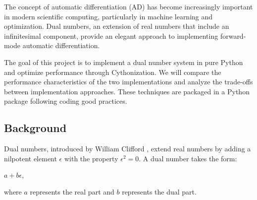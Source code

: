 The concept of automatic differentiation (AD) has become increasingly important in modern scientific computing, 
particularly in machine learning and optimization. Dual numbers, an extension of real numbers that include an 
infinitesimal component, provide an elegant approach to implementing forward-mode automatic differentiation.

The goal of this project is to implement a dual number system in pure Python and optimize performance through Cythonization. 
We will compare the performance characteristics of the two implementations and analyze the trade-offs between 
implementation approaches. These techniques are packaged in a Python package following coding good practices.

\subsection{Background}
Dual numbers, introduced by William Clifford \cite{clifford1873}, extend real numbers by adding a nilpotent element 
$\epsilon$ with the property $\epsilon^2 = 0$. A dual number takes the form:

 $a + b\epsilon$, 

where $a$ represents the real part and $b$ represents the dual part.